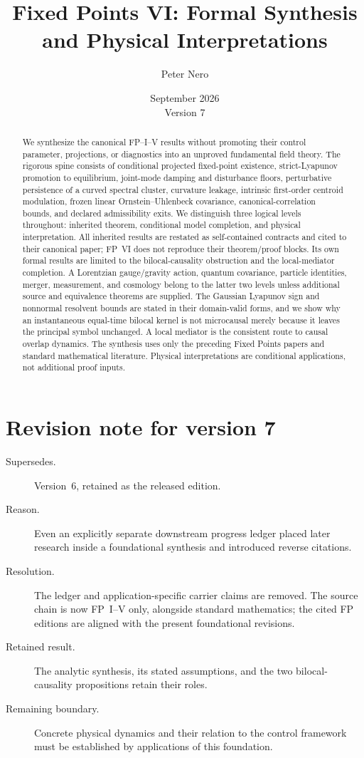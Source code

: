 \documentclass[11pt]{article}
\title{Fixed Points VI: Formal Synthesis and Physical Interpretations}
\author{Peter Nero}
\date{September 2026\\Version 7}
\begin{document}
\maketitle
\seriestagline

\begin{abstract}
We synthesize the canonical FP--I--V results without promoting their control
parameter, projections, or diagnostics into an unproved fundamental field
theory. The rigorous spine consists of conditional projected fixed-point
existence, strict-Lyapunov promotion to equilibrium, joint-mode damping and
disturbance floors, perturbative persistence of a curved spectral cluster,
curvature leakage, intrinsic first-order centroid modulation, frozen linear
Ornstein--Uhlenbeck covariance, canonical-correlation bounds, and declared
admissibility exits. We distinguish three logical levels throughout:
inherited theorem, conditional model completion, and physical interpretation.
All inherited results are restated as self-contained contracts and cited to
their canonical paper; FP~VI does not reproduce their theorem/proof blocks.
Its own formal results are limited to the bilocal-causality obstruction and
the local-mediator completion.
A Lorentzian gauge/gravity action, quantum covariance, particle identities,
merger, measurement, and cosmology belong to the latter two levels unless
additional source and equivalence theorems are supplied. The Gaussian
Lyapunov sign and nonnormal resolvent bounds are stated in their domain-valid
forms, and we show why an
instantaneous equal-time bilocal kernel is not microcausal merely because it
leaves the principal symbol unchanged. A local mediator is the consistent
route to causal overlap dynamics. The synthesis uses only the preceding
Fixed Points papers and standard mathematical literature. Physical
interpretations are conditional applications, not additional proof inputs.
\end{abstract}

\section*{Revision note for version 7}
\begin{description}
\item[Supersedes.] Version~6, retained as the released edition.
\item[Reason.] Even an explicitly separate downstream progress ledger placed
later research inside a foundational synthesis and introduced reverse citations.
\item[Resolution.] The ledger and application-specific carrier claims are
removed. The source chain is now FP~I--V only, alongside standard mathematics;
the cited FP editions are aligned with the present foundational revisions.
\item[Retained result.] The analytic synthesis, its stated assumptions, and
the two bilocal-causality propositions retain their roles.
\item[Remaining boundary.] Concrete physical dynamics and their relation to
the control framework must be established by applications of this foundation.
\end{description}
\end{document}

